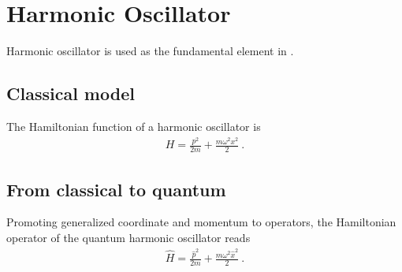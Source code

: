 \documentclass[letterpaper,10pt,english]{jupyterBook}
\begin{document}
\sphinxstepscope


\section{Harmonic Oscillator}
\label{\detokenize{ch/quantum-mechanics/qft/harmonic-oscillator:harmonic-oscillator}}\label{\detokenize{ch/quantum-mechanics/qft/harmonic-oscillator:quantum-mechanics-qft-harmonic-oscillator}}\label{\detokenize{ch/quantum-mechanics/qft/harmonic-oscillator::doc}}
\sphinxAtStartPar
Harmonic oscillator is used as the fundamental element in {\hyperref[\detokenize{ch/quantum-mechanics/qft/field-quantization:quantum-mechanics-qft-field-quantization}]{}}.


\subsection{Classical model}
\label{\detokenize{ch/quantum-mechanics/qft/harmonic-oscillator:classical-model}}\label{\detokenize{ch/quantum-mechanics/qft/harmonic-oscillator:quantum-mechanics-qft-harmonic-oscillator-classical}}
\sphinxAtStartPar
The Hamiltonian function of a harmonic oscillator is
\begin{equation*}
\begin{split}
H=\frac{p^2}{2m}+\frac{m\omega^2x^2}{2} \ .
\end{split}
\end{equation*}

\subsection{From classical to quantum}
\label{\detokenize{ch/quantum-mechanics/qft/harmonic-oscillator:from-classical-to-quantum}}\label{\detokenize{ch/quantum-mechanics/qft/harmonic-oscillator:quantum-mechanics-qft-harmonic-oscillator-quantization}}
\sphinxAtStartPar
Promoting generalized coordinate and momentum to operators, the Hamiltonian operator of the quantum harmonic oscillator reads
\begin{equation*}
\begin{split}
\hat{H} = \frac{\hat p^2}{2m}+\frac{m\omega^2\hat x^2}{2} \ .
\end{split}
\end{equation*}
\end{document}
